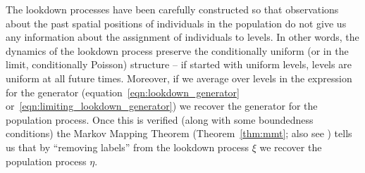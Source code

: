 \documentclass[EJP]{ejpecp} %
\newcommand{\lp}{\xi}              %
\newcommand{\citet}[1]{\cite{#1}}
\newcommand{\citep}[1]{\cite{#1}}
\begin{document}
The lookdown processes have been carefully constructed so that
observations about the past spatial positions of individuals in 
the population do not give us any information about the assignment of 
individuals to levels.
In other words, the dynamics of the lookdown
process preserve the conditionally uniform (or in the limit, conditionally Poisson) structure
-- if started with uniform levels,
levels are uniform at all future times.
Moreover, if we average over levels in the expression for the generator
(equation~\eqref{eqn:lookdown_generator} or~\eqref{eqn:limiting_lookdown_generator})
we recover the generator for the population process.
Once this is verified (along with some boundedness conditions)
the Markov Mapping Theorem (Theorem~\ref{thm:mmt}; also see \citet{etheridge/kurtz:2019})
tells us that by ``removing labels'' from the lookdown process $\lp$
we recover the population process $\eta$.
\end{document}
